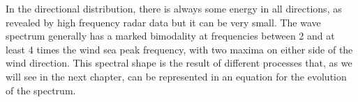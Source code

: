 In the directional distribution, there is always some energy in all directions, as revealed by high frequency radar data \citep[e.g.][]{Barrick&al.1974,Tyler&al.1974}
 but it can be very 
small. The wave spectrum generally has a marked bimodality at frequencies between 2 and at least 4 times the wind sea peak frequency, with two maxima on either side of the wind 
direction. This spectral shape is the result of different processes that, as we will see in the next chapter, can be represented in an equation for the evolution of the spectrum. 
